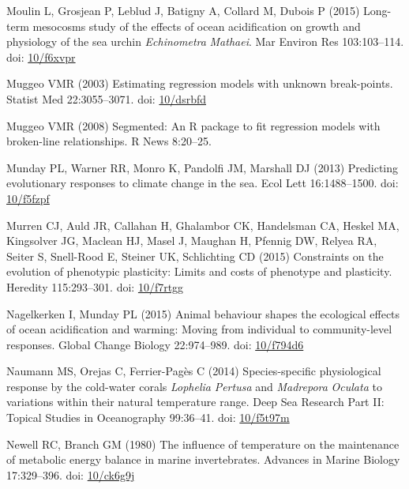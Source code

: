 \documentclass[a4paper,10pt, oneside]{memoir}
\begin{document}
\leavevmode\hypertarget{ref-Moulin2015}{}%
Moulin L, Grosjean P, Leblud J, Batigny A, Collard M, Dubois P (2015) Long-term mesocosms study of the effects of ocean acidification on growth and physiology of the sea urchin \emph{Echinometra} \emph{Mathaei}. Mar Environ Res 103:103--114. doi: \href{https://doi.org/10/f6xvpr}{10/f6xvpr}

\leavevmode\hypertarget{ref-Muggeo2003}{}%
Muggeo VMR (2003) Estimating regression models with unknown break-points. Statist Med 22:3055--3071. doi: \href{https://doi.org/10/dsrbfd}{10/dsrbfd}

\leavevmode\hypertarget{ref-Muggeo2008}{}%
Muggeo VMR (2008) Segmented: An R package to fit regression models with broken-line relationships. R News 8:20--25.

\leavevmode\hypertarget{ref-Munday2013}{}%
Munday PL, Warner RR, Monro K, Pandolfi JM, Marshall DJ (2013) Predicting evolutionary responses to climate change in the sea. Ecol Lett 16:1488--1500. doi: \href{https://doi.org/10/f5fzpf}{10/f5fzpf}

\leavevmode\hypertarget{ref-Murren2015}{}%
Murren CJ, Auld JR, Callahan H, Ghalambor CK, Handelsman CA, Heskel MA, Kingsolver JG, Maclean HJ, Masel J, Maughan H, Pfennig DW, Relyea RA, Seiter S, Snell-Rood E, Steiner UK, Schlichting CD (2015) Constraints on the evolution of phenotypic plasticity: Limits and costs of phenotype and plasticity. Heredity 115:293--301. doi: \href{https://doi.org/10/f7rtgg}{10/f7rtgg}

\leavevmode\hypertarget{ref-Nagelkerken2015}{}%
Nagelkerken I, Munday PL (2015) Animal behaviour shapes the ecological effects of ocean acidification and warming: Moving from individual to community-level responses. Global Change Biology 22:974--989. doi: \href{https://doi.org/10/f794d6}{10/f794d6}

\leavevmode\hypertarget{ref-Naumann2014}{}%
Naumann MS, Orejas C, Ferrier-Pagès C (2014) Species-specific physiological response by the cold-water corals \emph{Lophelia} \emph{Pertusa} and \emph{Madrepora} \emph{Oculata} to variations within their natural temperature range. Deep Sea Research Part II: Topical Studies in Oceanography 99:36--41. doi: \href{https://doi.org/10/f5t97m}{10/f5t97m}

\leavevmode\hypertarget{ref-Newell1980}{}%
Newell RC, Branch GM (1980) The influence of temperature on the maintenance of metabolic energy balance in marine invertebrates. Advances in Marine Biology 17:329--396. doi: \href{https://doi.org/10/ck6g9j}{10/ck6g9j}
\end{document}
